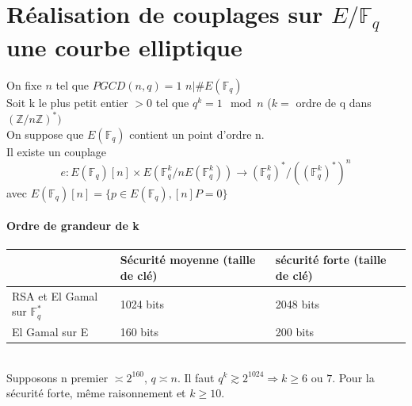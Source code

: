 \documentclass[12pt,a4paper]{report}
\begin{document}
\section{Réalisation de couplages sur $E/\mathbb{F}_q$ une courbe elliptique}
On fixe $n$ tel que $PGCD(n,q) = 1$ $n | \#E(\mathbb{F}_q) $ \\
Soit k le plus petit entier $>0$ tel que $ q^k = 1 \mod n$ ($k=$ ordre de q dans $(\mathbb{Z}/n\mathbb{Z})^*)$\\
On suppose que $E(\mathbb{F}_q)$ contient un point d'ordre n. \\
Il existe un couplage 
$$ e: E(\mathbb{F}_q) [n] \times E(\mathbb{F}_q^k / n E(\mathbb{F}_q^k)) \rightarrow (\mathbb{F}_q^k)^* / ((\mathbb{F}_q^k)^*)^n $$
avec $E(\mathbb{F}_q) [n] = \{p \in E(\mathbb{F}_q), [n]P=0\}$

\paragraph{Ordre de grandeur de k \\}
\begin{tabular}{|p{4cm}|p{4cm}|p{4cm}|}
\hline
 & Sécurité moyenne (taille de clé) & sécurité forte (taille de clé) \\\hline
RSA et El Gamal sur $\mathbb{F}_q^*$ & 1024 bits & 2048 bits \\\hline
El Gamal sur E & 160 bits & 200 bits\\ \hline 
\end{tabular}\\
Supposons n premier $\asymp 2^{160}$, $q\asymp n$. Il faut $q^k\gtrsim 2^{1024} \Rightarrow k\geqslant 6$ ou $ 7$. Pour la sécurité forte, même raisonnement et $k \geqslant 10$.
\end{document}
